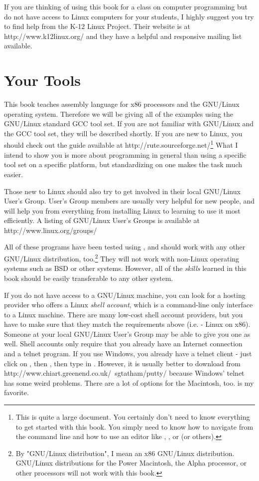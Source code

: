 If you are thinking of using this book for a class on computer programming but
do not have access to Linux computers for your students, I highly suggest you
try to find help from the K-12 Linux Project.  Their website is at 
http://www.k12linux.org/ and they have a helpful and responsive mailing list
available.

\section{Your Tools}

This book teaches assembly language for x86 processors and the GNU/Linux
operating system.  Therefore we will be giving all of 
the examples using the GNU/Linux standard GCC tool set. 
If you are not familiar with GNU/Linux and the GCC tool set, they will
be described shortly.  If you are new to Linux, you 
should check out the guide available at 
http://rute.sourceforge.net/\footnote{This is quite a large 
document.  You certainly don't need to know everything to get started 
with this book.  You simply need to know how to navigate from the command
line and how to use an editor like , 
, or  
(or others).}
What I intend to show you is more about programming in general than using
a specific tool set on a specific platform, but standardizing on one 
makes the task much easier.

Those new to Linux should also try to get involved in their local GNU/Linux
User's Group.  User's Group members are usually very helpful for new people,
and will help you from everything from installing Linux to learning to
use it most efficiently.  A listing of GNU/Linux User's Groups is available
at http://www.linux.org/groups/

All of these
programs have been tested using , 
and should work with any other GNU/Linux distribution, too.\footnote{By 
"GNU/Linux distribution", I mean an x86 GNU/Linux distribution.  GNU/Linux 
distributions for the Power Macintosh, the Alpha processor, or other 
processors will not work with this book.}  They will
not work with non-Linux operating systems such as BSD or other systems.
However, all of the \emph{skills} learned in this book 
should be easily transferable to any other system.  

If you do not have access to a GNU/Linux machine, you can look for
a hosting provider who offers a Linux \emph{shell account}, which
is a command-line only interface to a Linux machine.  
There are many low-cost
shell account providers, but you have to make sure that they match the 
requirements above (i.e. - Linux on x86).  
Someone at your local GNU/Linux User's Group may be able to give you one as 
well.  Shell accounts only require
that you already have an Internet connection and a telnet program.  If you use
Windows\textregistered, you already have a telnet client - just click on 
, then , then type in 
.  However, it is usually better to download
 from
http://www.chiart.greenend.co.uk/~sgtatham/putty/
because Windows' telnet has some weird problems.  There are a lot of options
for the Macintosh, too.   is my 
favorite.

